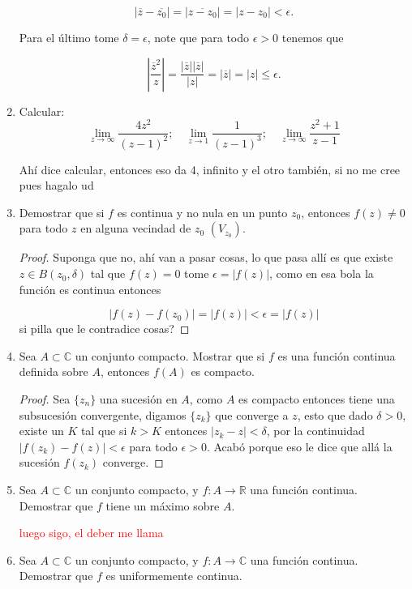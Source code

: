\documentclass[11pt]{article}
\begin{document}
\begin{enumerate}
$$|\overline{z}-\overline{z_0}|=|\overline{z-z_0}|=|z-z_0|<\epsilon.$$

Para el último tome $\delta=\epsilon$, note que para todo $\epsilon>0$ tenemos que

$$\left|\frac{\overline{z}^2}{z} \right|=\frac{|\overline{z}||\overline{z}|}{|z|}=|\overline{z}|=|z|\leq\epsilon.$$

    \item Calcular:
    \[
    \lim_{z \to \infty} \frac{4z^2}{(z - 1)^2}; \quad \lim_{z \to 1} \frac{1}{(z - 1)^3}; \quad \lim_{z \to \infty} \frac{z^2 + 1}{z - 1}
    \]

    Ahí dice calcular, entonces eso da 4, infinito y el otro también, si no me cree pues hagalo ud

    \item Demostrar que si $f$ es continua y no nula en un punto $z_0$, entonces $f(z) \neq 0$ para todo $z$ en alguna vecindad de $z_0$ $(V_{z_0})$.

\begin{proof}
Suponga que no, ahí van a pasar cosas, lo que pasa allí es que existe $z\in B(z_0,\delta)$ tal que $f(z)=0$ tome $\epsilon=|f(z)|$, como en esa bola la función es continua entonces

$$|f(z)-f(z_0)|=|f(z)|<\epsilon=|f(z)|$$
si pilla que le contradice cosas?
\end{proof}

    \item Sea $A \subset \mathbb{C}$ un conjunto compacto. Mostrar que si $f$ es una función continua definida sobre $A$, entonces $f(A)$ es compacto.

\begin{proof}
Sea $\{z_n\}$ una sucesión en $A$, como $A$ es compacto entonces tiene una subsucesión convergente, digamos $\{z_{k}\}$ que converge a $z$, esto que dado $\delta>0$, existe un $K$ tal que si $k>K$ entonces $|z_{k}-z|<\delta$, por la continuidad $|f(z_k)-f(z)|<\epsilon$ para todo $\epsilon>0$. Acabó porque eso le dice que allá la sucesión $f(z_k)$ converge.
\end{proof}

    \item Sea $A \subset \mathbb{C}$ un conjunto compacto, y $f: A \to \mathbb{R}$ una función continua. Demostrar que $f$ tiene un máximo sobre $A$.

    \textcolor{red}{luego sigo, el deber me llama}

    \item Sea $A \subset \mathbb{C}$ un conjunto compacto, y $f: A \to \mathbb{C}$ una función continua. Demostrar que $f$ es uniformemente continua.
\end{enumerate}
\end{document}
